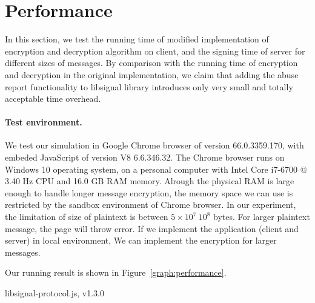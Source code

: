 
\section{Performance}
In this section, we test the running time of modified implementation of encryption and decryption algorithm on client,
and the signing time of server for different sizes of messages.
By comparison with the running time of encryption and decryption in the original implementation,
we claim that adding the abuse report functionality to libsignal library introduces only very small and totally acceptable time overhead. 





\paragraph{Test environment.}
We test our simulation in Google Chrome browser of version 66.0.3359.170,
with embeded JavaScript of version V8 6.6.346.32.
The Chrome browser runs on Windows 10 operating system,
on a personal computer with Intel Core i7-6700 @ 3.40 Hz CPU and 16.0 GB RAM memory.
Alrough the physical RAM is large enough to handle longer message encryption,
the memory space we can use is restricted by the sandbox environment of Chrome browser.
In our experiment, the limitation of size of plaintext is between $5 \times 10^7 ~ 10^8$ bytes.
For larger plaintext message, the page will throw error.
If we implement the application (client and server) in local environment,
We can implement the encryption for larger messages.

Our running result is shown in Figure~\ref{graph:performance}.

libsignal-protocol.js, v1.3.0


